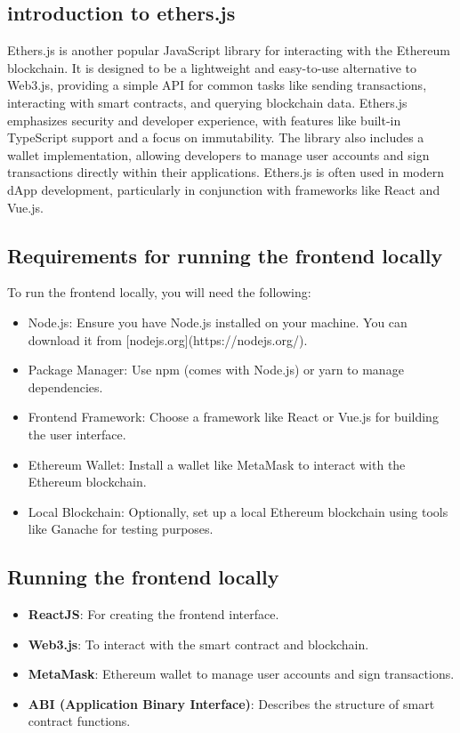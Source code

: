 \documentclass[12pt, a4paper]{article}
\begin{document}
\subsection{introduction to ethers.js}
Ethers.js is another popular JavaScript library for interacting with the Ethereum blockchain. It is designed to be a lightweight and easy-to-use alternative to Web3.js, providing a simple API for common tasks like sending transactions, interacting with smart contracts, and querying blockchain data. Ethers.js emphasizes security and developer experience, with features like built-in TypeScript support and a focus on immutability. The library also includes a wallet implementation, allowing developers to manage user accounts and sign transactions directly within their applications. Ethers.js is often used in modern dApp development, particularly in conjunction with frameworks like React and Vue.js. 
\subsection{Requirements for running the frontend locally}
To run the frontend locally, you will need the following:
\begin{itemize}
    \item Node.js: Ensure you have Node.js installed on your machine. You can download it from [nodejs.org](https://nodejs.org/).
    \item Package Manager: Use npm (comes with Node.js) or yarn to manage dependencies.
    \item Frontend Framework: Choose a framework like React or Vue.js for building the user interface.
    \item Ethereum Wallet: Install a wallet like MetaMask to interact with the Ethereum blockchain.
    \item Local Blockchain: Optionally, set up a local Ethereum blockchain using tools like Ganache for testing purposes.
\end{itemize}
\subsection{Running the frontend locally}
\begin{itemize}
  \item \textbf{ReactJS}: For creating the frontend interface.
  \item \textbf{Web3.js}: To interact with the smart contract and blockchain.
  \item \textbf{MetaMask}: Ethereum wallet to manage user accounts and sign transactions.
  \item \textbf{ABI (Application Binary Interface)}: Describes the structure of smart contract functions.
\end{itemize}
\end{document}
